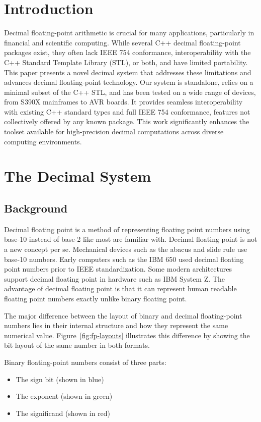 \documentclass[acmsmall]{acmart}
\begin{document}
\section{Introduction}
Decimal floating-point arithmetic is crucial for many applications\cite{cowlishaw2003decimal}, particularly in financial and scientific computing. 
While several C++ decimal floating-point packages exist, they often lack IEEE 754\cite{ieee754-2019} conformance, interoperability with the C++ Standard Template Library (STL), or both, and have limited portability. 
This paper presents a novel decimal system that addresses these limitations and advances decimal floating-point technology. 
Our system is standalone, relies on a minimal subset of the C++ STL, and has been tested on a wide range of devices, from S390X mainframes to AVR boards. 
It provides seamless interoperability with existing C++ standard types and full IEEE 754 conformance, features not collectively offered by any known package. 
This work significantly enhances the toolset available for high-precision decimal computations across diverse computing environments.

\section{The Decimal System}

\subsection{Background}
Decimal floating point is a method of representing floating point numbers using base-10 instead of base-2 like most are familiar with.
Decimal floating point is not a new concept per se. 
Mechanical devices such as the abacus and slide rule use base-10 numbers.
Early computers such as the IBM 650 used decimal floating point numbers prior to IEEE standardization\cite{beebe2017historical}.
Some modern architectures support decimal floating point in hardware such as IBM System Z\cite{schwarz2009decimal}.
The advantage of decimal floating point is that it can represent human readable floating point numbers exactly unlike binary floating point.

The major difference between the layout of binary and decimal floating-point numbers lies in their internal structure and how they represent the same numerical value. Figure~\ref{fig:fp-layouts} illustrates this difference by showing the bit layout of the same number in both formats.

Binary floating-point numbers consist of three parts:
\begin{itemize}
    \item The sign bit (shown in blue)
    \item The exponent (shown in green)
    \item The significand (shown in red)
\end{itemize}
\end{document}
